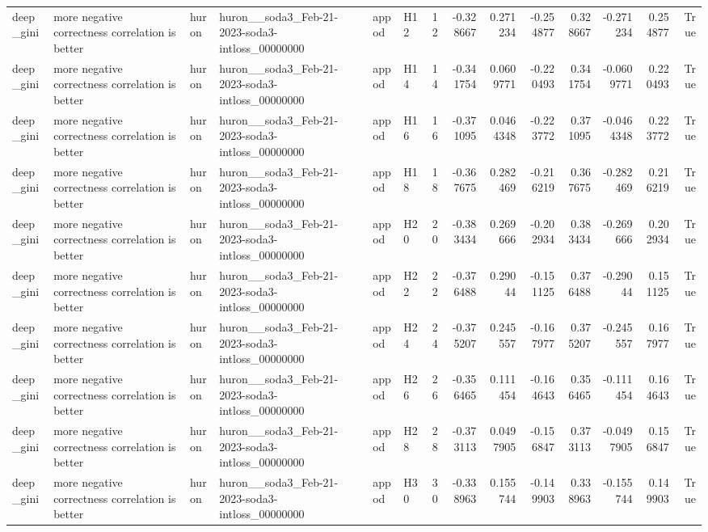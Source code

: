 \begin{longtable}{llllllrrrrrrrr}
deep\_gini & more negative correctness correlation is better & huron & huron\_\_soda3\_Feb-21-2023-soda3-intloss\_00000000 & appod & H12 & 12 & -0.328667 & 0.271234 & -0.254877 & 0.328667 & -0.271234 & 0.254877 & True \\
deep\_gini & more negative correctness correlation is better & huron & huron\_\_soda3\_Feb-21-2023-soda3-intloss\_00000000 & appod & H14 & 14 & -0.341754 & 0.0609771 & -0.220493 & 0.341754 & -0.0609771 & 0.220493 & True \\
deep\_gini & more negative correctness correlation is better & huron & huron\_\_soda3\_Feb-21-2023-soda3-intloss\_00000000 & appod & H16 & 16 & -0.371095 & 0.0464348 & -0.223772 & 0.371095 & -0.0464348 & 0.223772 & True \\
deep\_gini & more negative correctness correlation is better & huron & huron\_\_soda3\_Feb-21-2023-soda3-intloss\_00000000 & appod & H18 & 18 & -0.367675 & 0.282469 & -0.216219 & 0.367675 & -0.282469 & 0.216219 & True \\
deep\_gini & more negative correctness correlation is better & huron & huron\_\_soda3\_Feb-21-2023-soda3-intloss\_00000000 & appod & H20 & 20 & -0.383434 & 0.269666 & -0.202934 & 0.383434 & -0.269666 & 0.202934 & True \\
deep\_gini & more negative correctness correlation is better & huron & huron\_\_soda3\_Feb-21-2023-soda3-intloss\_00000000 & appod & H22 & 22 & -0.376488 & 0.29044 & -0.151125 & 0.376488 & -0.29044 & 0.151125 & True \\
deep\_gini & more negative correctness correlation is better & huron & huron\_\_soda3\_Feb-21-2023-soda3-intloss\_00000000 & appod & H24 & 24 & -0.375207 & 0.245557 & -0.167977 & 0.375207 & -0.245557 & 0.167977 & True \\
deep\_gini & more negative correctness correlation is better & huron & huron\_\_soda3\_Feb-21-2023-soda3-intloss\_00000000 & appod & H26 & 26 & -0.356465 & 0.111454 & -0.164643 & 0.356465 & -0.111454 & 0.164643 & True \\
deep\_gini & more negative correctness correlation is better & huron & huron\_\_soda3\_Feb-21-2023-soda3-intloss\_00000000 & appod & H28 & 28 & -0.373113 & 0.0497905 & -0.156847 & 0.373113 & -0.0497905 & 0.156847 & True \\
deep\_gini & more negative correctness correlation is better & huron & huron\_\_soda3\_Feb-21-2023-soda3-intloss\_00000000 & appod & H30 & 30 & -0.338963 & 0.155744 & -0.149903 & 0.338963 & -0.155744 & 0.149903 & True \\

\end{longtable}
